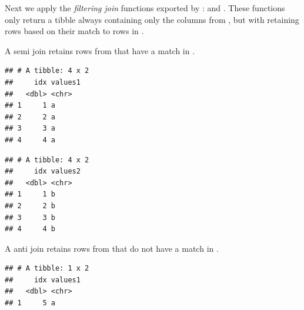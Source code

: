 \documentclass[krantz2]{krantz}\usepackage{knitr}%
\begin{document}
Next we apply the \emph{filtering join} functions exported by :  and . These functions only return a tibble always containing only the columns from , but with retaining rows based on their match to rows in .

A semi join retains rows from  that have a match in .

\begin{knitrout}\footnotesize
{}\color{fgcolor}\begin{kframe}
\begin{alltt}
\hlstd{(}   
\end{alltt}


{\ttfamily\noindent\itshape{}}\begin{verbatim}
## # A tibble: 4 x 2
##     idx values1
##   <dbl> <chr>  
## 1     1 a      
## 2     2 a      
## 3     3 a      
## 4     4 a
\end{verbatim}
\end{kframe}
\end{knitrout}

\begin{knitrout}\footnotesize
{}\color{fgcolor}\begin{kframe}
\begin{alltt}
\hlstd{(}   
\end{alltt}


{\ttfamily\noindent\itshape{}}\begin{verbatim}
## # A tibble: 4 x 2
##     idx values2
##   <dbl> <chr>  
## 1     1 b      
## 2     2 b      
## 3     3 b      
## 4     4 b
\end{verbatim}
\end{kframe}
\end{knitrout}

A anti join retains rows from  that do not have a match in .

\begin{knitrout}\footnotesize
{}\color{fgcolor}\begin{kframe}
\begin{alltt}
\hlstd{(}   
\end{alltt}


{\ttfamily\noindent\itshape{}}\begin{verbatim}
## # A tibble: 1 x 2
##     idx values1
##   <dbl> <chr>  
## 1     5 a
\end{verbatim}
\end{kframe}
\end{knitrout}
\end{document}
